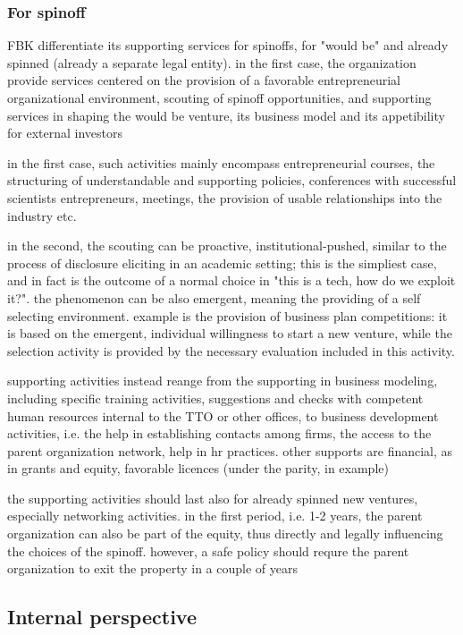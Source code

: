 \subsubsection{For spinoff}

FBK differentiate its supporting services for spinoffs, for "would be" and already spinned (already a separate legal entity). in the first case, the organization provide services centered on the provision of a favorable entrepreneurial organizational environment, scouting of spinoff opportunities, and supporting services in shaping the would be venture, its business model and its appetibility for external investors

in the first case, such activities mainly encompass entrepreneurial courses, the structuring of understandable and supporting policies, conferences with successful scientists entrepreneurs, meetings, the provision of usable relationships into the industry etc.

in the second, the scouting can be proactive, institutional-pushed, similar to the process of disclosure eliciting in an academic setting; this is the simpliest case, and in fact is the outcome of a normal choice in "this is a tech, how do we exploit it?". the phenomenon can be also emergent, meaning the providing of a self selecting environment. example is the provision of business plan competitions: it is based on the emergent, individual willingness to start a new venture, while the selection activity is provided by the necessary evaluation included in this activity.

supporting activities instead reange from the supporting in business modeling, including specific training activities, suggestions and checks with competent human resources internal to the TTO or other offices, to business development activities, i.e. the help in establishing contacts among firms, the access to the parent organization network, help in hr practices. other supports are financial, as in grants and equity, favorable licences (under the parity, in example)

the supporting activities should last also for already spinned new ventures, especially networking activities. in the first period, i.e. 1-2 years, the parent organization can also be part of the equity, thus directly and legally influencing the choices of the spinoff. however, a safe policy should requre the parent organization to exit the property in a couple of years

\subsection{Internal perspective}

